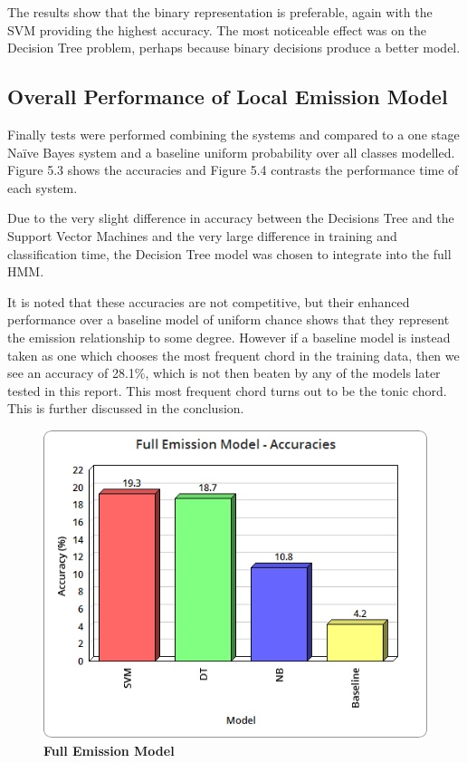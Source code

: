\documentclass[bsc,singlespacing,parskip,deptreport,twoside,frontabs]{infthesis}
\begin{document}
The results show that the binary representation is preferable, again with the SVM providing the highest accuracy. The most noticeable effect was on the Decision Tree problem, perhaps because binary decisions produce a better model.

\subsection{Overall Performance of Local Emission Model}

Finally tests were performed combining the systems and compared to a one stage Na\"ive Bayes system and a baseline uniform probability over all classes modelled. Figure 5.3 shows the accuracies and Figure 5.4 contrasts the performance time of each system.

Due to the very slight difference in accuracy between the Decisions Tree and the Support Vector Machines and the very large difference in training and classification time, the Decision Tree model was chosen to integrate into the full HMM.

It is noted that these accuracies are not competitive, but their enhanced performance over a baseline model of uniform chance shows that they represent the emission relationship to some degree. However if a baseline model is instead taken as one which chooses the most frequent chord in the training data, then we see an accuracy of 28.1\%, which is not then beaten by any of the models later tested in this report. This most frequent chord turns out to be the tonic chord. This is further discussed in the conclusion. 

\begin{figure}
  \caption{\textbf{Full Emission Model}}
  \centering
    \includegraphics[scale=0.5]{em}
\end{figure}
\end{document}
